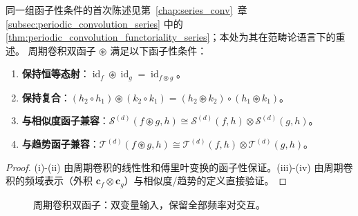 \begin{theorem}[周期卷积的函子性]\label{thm:periodic_convolution_functoriality}
同一组函子性条件的首次陈述见第~\ref{chap:series_conv}~章 \cref{subsec:periodic_convolution_series} 中的 \cref{thm:periodic_convolution_functoriality_series}；本处为其在范畴论语言下的重述。
周期卷积双函子 $\circledast$ 满足以下函子性条件：
\begin{enumerate}[label=(\roman*)]
    \item \textbf{保持恒等态射}：$\operatorname{id}_f \circledast \operatorname{id}_g = \operatorname{id}_{f \circledast g}$。
    \item \textbf{保持复合}：$(h_2 \circ h_1) \circledast (k_2 \circ k_1) = (h_2 \circledast k_2) \circ (h_1 \circledast k_1)$。
    \item \textbf{与相似度函子兼容}：$\mathcal{S}^{(d)}(f \circledast g, h) \cong \mathcal{S}^{(d)}(f, h) \otimes \mathcal{S}^{(d)}(g, h)$。
    \item \textbf{与趋势函子兼容}：$\mathcal{T}^{(d)}(f \circledast g, h) \cong \mathcal{T}^{(d)}(f, h) \otimes \mathcal{T}^{(d)}(g, h)$。
\end{enumerate}
\end{theorem}

\begin{proof}
(i)-(ii) 由周期卷积的线性性和傅里叶变换的函子性保证。(iii)-(iv) 由周期卷积的频域表示（外积 $\mathbf{c}_f \otimes \mathbf{c}_g$）与相似度/趋势的定义直接验证。
\end{proof}

\begin{figure}[htbp]
\centering
{}
\caption{周期卷积双函子：双变量输入，保留全部频率对交互。}
\label{fig:periodic_convolution_bifunctor}
\end{figure}

